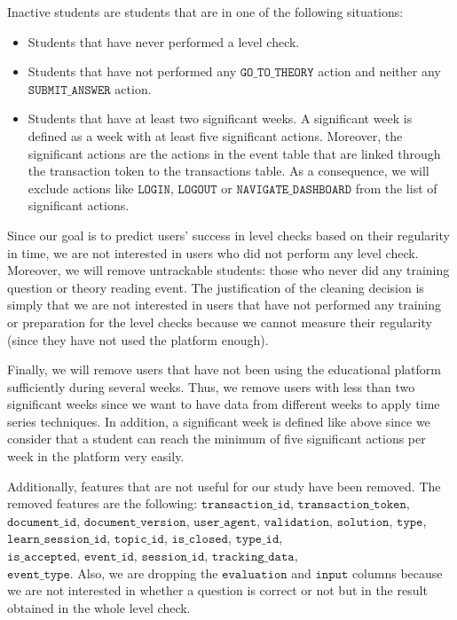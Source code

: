 \documentclass[sigplan,screen]{acmart}
\begin{document}
Inactive students are students that are in one of the following situations:
\begin{itemize}
\item Students that have never performed a level check.
\item Students that have not performed any $\texttt{GO\_TO\_THEORY}$ action and neither any $\texttt{SUBMIT\_ANSWER}$ action.
\item Students that have at least two significant weeks. A significant week is defined as a
week with at least five significant actions. Moreover, the significant actions are the
actions in the event table that are linked through the transaction token to the
transactions table. As a consequence, we will exclude actions like $\texttt{LOGIN}$,
$\texttt{LOGOUT}$ or $\texttt{NAVIGATE\_DASHBOARD}$ from the list of significant actions.
\end{itemize}
Since our goal is to predict users' success in level checks based on their regularity in time, we are not interested in users who did not perform any level check. Moreover, we will remove untrackable students: those who never did any training question or theory reading event. The justification of the cleaning decision is simply that we are not interested in users that have not performed any training or preparation for the level checks because we cannot measure their regularity (since they have not used the platform enough).

Finally, we will remove users that have not been using the educational platform sufficiently during several weeks. Thus, we remove users with less than two significant weeks since we want to have data from different weeks to apply time series techniques. In addition, a significant week is defined like above since we consider that a student can reach the minimum of five significant actions per week in the platform very easily.

Additionally, features that are not useful for our study have been removed. The removed features are the following: $\texttt{transaction\_id}$, $\texttt{transaction\_token}$, $\texttt{document\_id}$, $\texttt{document\_version}$, $\texttt{user\_agent}$, $\texttt{validation}$, $\texttt{solution}$, $\texttt{type}$, $\texttt{learn\_session\_id}$, $\texttt{topic\_id}$, $\texttt{is\_closed}$, $\texttt{type\_id}$, \\ $\texttt{is\_accepted}$, $\texttt{event\_id}$, $\texttt{session\_id}$, $\texttt{tracking\_data}$, \\ $\texttt{event\_type}$. Also, we are dropping the $\texttt{evaluation}$ and $\texttt{input}$ columns because we are not interested in whether a question is correct or not but in the result obtained in the whole level check.
\end{document}
